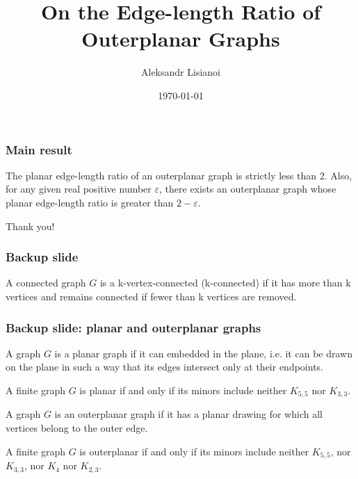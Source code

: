 \documentclass[xetex,mathserif,serif]{beamer}
\title{On the Edge-length Ratio of Outerplanar Graphs}
\author{Aleksandr Lisianoi}
\institute{Technische Universität Wien}
\date{\today}
\begin{document}
\maketitle

\begin{frame}
  \frametitle{Main result}
  \begin{theorem}
    The planar edge-length ratio of an outerplanar graph is strictly less than 2. Also, for any given real positive number \(\varepsilon\), there exists an outerplanar graph whose planar edge-length ratio is greater than \(2 - \varepsilon\).
    \end{theorem}
  \end{frame}

\begin{frame}[standout]
  Thank you!
  \end{frame}

\begin{frame}
    \frametitle{Backup slide}

    \begin{definition}
      A connected graph \(G\) is a k-vertex-connected (k-connected) if it has more than k vertices and remains connected if fewer than k vertices are removed.
    \end{definition}
  \end{frame}

  \begin{frame}
    \frametitle{Backup slide: planar and outerplanar graphs}

    \begin{definition}
      A graph \(G\) is a planar graph if it can embedded in the plane, i.e. it can be drawn on the plane in such a way that its edges intersect only at their endpoints.
    \end{definition}

    \begin{definition}
      A finite graph \(G\) is planar if and only if its minors include neither \(K_{5,5}\) nor \(K_{3, 3}\).
    \end{definition}

    \begin{definition}
      A graph \(G\) is an outerplanar graph if it has a planar drawing for which all vertices belong to the outer edge.
    \end{definition}

    \begin{definition}
      A finite graph \(G\) is outerplanar if and only if its minors include neither \(K_{5, 5}\), nor \(K_{3, 3}\), nor \(K_4\) nor \(K_{2, 3}\).
    \end{definition}
  \end{frame}
\end{document}
